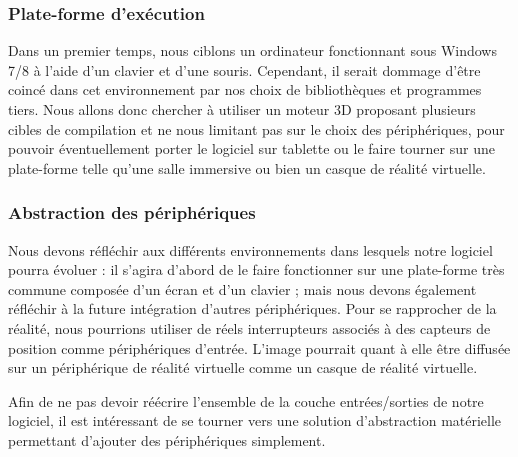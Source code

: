 \subsubsection{Plate-forme d'exécution}

Dans un premier temps, nous ciblons un ordinateur fonctionnant sous Windows 7/8 à l'aide d'un clavier et d'une souris. Cependant, il serait dommage d'être coincé dans cet environnement par nos choix de bibliothèques et programmes tiers. Nous allons donc chercher à utiliser un moteur 3D proposant plusieurs cibles de compilation et ne nous limitant pas sur le choix des périphériques, pour pouvoir éventuellement porter le logiciel sur tablette ou le faire tourner sur une plate-forme telle qu'une salle immersive ou bien un casque de réalité virtuelle.

\subsubsection{Abstraction des périphériques}

Nous devons réfléchir aux différents environnements dans lesquels notre logiciel pourra évoluer : il s'agira d'abord de le faire fonctionner sur une plate-forme très commune composée d'un écran et d'un clavier ; mais nous devons également réfléchir à la future intégration d'autres périphériques. Pour se rapprocher de la réalité, nous pourrions utiliser de réels interrupteurs associés à des capteurs de position comme périphériques d'entrée. L'image pourrait quant à elle être diffusée sur un périphérique de réalité virtuelle comme un casque de réalité virtuelle.

Afin de ne pas devoir réécrire l'ensemble de la couche entrées/sorties de notre logiciel, il est intéressant de se tourner vers une solution d'abstraction matérielle permettant d'ajouter des périphériques simplement.
